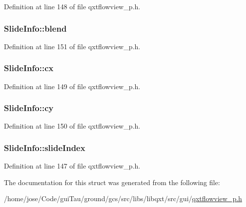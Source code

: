 Definition at line 148 of file qxtflowview\-\_\-p.\-h.

\hypertarget{struct_slide_info_a8df07b9d2429a27b3f1a7b341df3bf7b}{
\subsubsection[{blend}]{ Slide\-Info\-::blend}}\label{struct_slide_info_a8df07b9d2429a27b3f1a7b341df3bf7b}


Definition at line 151 of file qxtflowview\-\_\-p.\-h.

\hypertarget{struct_slide_info_a858a9387c92e84eabdde1c91aac8e1c6}{
\subsubsection[{cx}]{ Slide\-Info\-::cx}}\label{struct_slide_info_a858a9387c92e84eabdde1c91aac8e1c6}


Definition at line 149 of file qxtflowview\-\_\-p.\-h.

\hypertarget{struct_slide_info_aebd2ca3d204940e40018c778a842b133}{
\subsubsection[{cy}]{ Slide\-Info\-::cy}}\label{struct_slide_info_aebd2ca3d204940e40018c778a842b133}


Definition at line 150 of file qxtflowview\-\_\-p.\-h.

\hypertarget{struct_slide_info_a75666008da2e60cc35dd1a1e56e4d1c6}{
\subsubsection[{slide\-Index}]{ Slide\-Info\-::slide\-Index}}\label{struct_slide_info_a75666008da2e60cc35dd1a1e56e4d1c6}


Definition at line 147 of file qxtflowview\-\_\-p.\-h.



The documentation for this struct was generated from the following file\-:\begin{DoxyCompactItemize}
\item 
/home/jose/\-Code/gui\-Tau/ground/gcs/src/libs/libqxt/src/gui/\hyperlink{qxtflowview__p_8h}{qxtflowview\-\_\-p.\-h}\end{DoxyCompactItemize}
